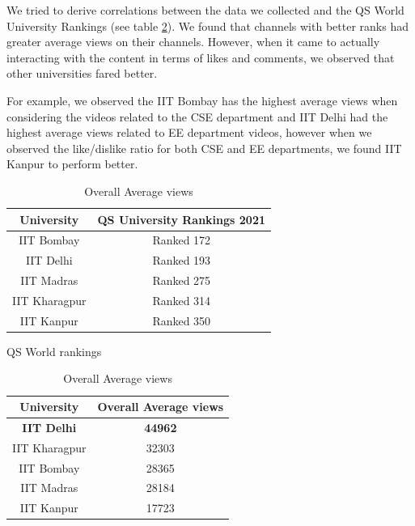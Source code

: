 \documentclass{article}
\begin{document}
We tried to derive correlations between the data we collected and the QS World University Rankings (see table \ref{qs_ranking}). We found that channels with better ranks had greater average views on their channels. However, when it came to actually interacting with the content in terms of likes and comments, we observed that other universities fared better.

For example, we observed the IIT Bombay has the highest average views when considering the videos related to the CSE department and IIT Delhi had the highest average views related to EE department videos, however when we observed the like/dislike ratio for both CSE and EE departments, we found IIT Kanpur to perform better.
\begin{table}[!htpb]
\parbox{.44\linewidth}{
\centering
\begin{tabular}{|c|c|}
\hline
University    & QS University Rankings 2021 \\ \hline
IIT Bombay    & Ranked 172          \\
IIT Delhi     & Ranked 193           \\
IIT Madras    & Ranked 275          \\
IIT Kharagpur & Ranked 314       \\
IIT Kanpur    & Ranked 350          \\
\hline     

\end{tabular}\vspace{3mm}
\caption{QS World rankings}
\label{qs_ranking}
}
\hfill
\parbox{.44\linewidth}{
\begin{tabular}{|c|c|}
\hline
University    & Overall Average views \\ \hline
\textbf{IIT Delhi}     & \textbf{44962}      \\
IIT Kharagpur & 32303      \\
IIT Bombay    & 28365      \\
IIT Madras    & 28184      \\
IIT Kanpur    & 17723 \\  \hline   
\end{tabular}\vspace{3mm}

\caption{Overall Average views}
}
\end{table}
 
\end{document}
